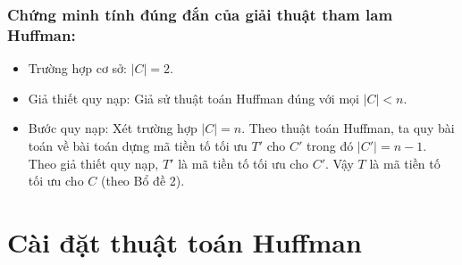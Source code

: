\subsubsection{Chứng minh tính đúng đắn của giải thuật tham lam Huffman:}

\begin{itemize}
    \item Trường hợp cơ sở: $|C| = 2$.
    \item Giả thiết quy nạp: Giả sử thuật toán Huffman đúng với mọi $|C| < n$.
    \item Bước quy nạp: Xét trường hợp $|C| = n$. Theo thuật toán Huffman, ta quy bài toán về bài toán dựng mã tiền tố tối ưu $T'$ cho $C'$ trong đó $|C'| = n-1$. Theo giả thiết quy nạp, $T'$ là mã tiền tố tối ưu cho $C'$. Vậy $T$ là mã tiền tố tối ưu cho $C$ (theo Bổ đề 2).
\end{itemize}

\section{Cài đặt thuật toán Huffman}

